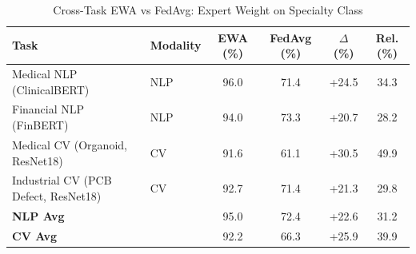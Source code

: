 \begin{table}[t]
\centering
\caption{Cross-Task EWA vs FedAvg: Expert Weight on Specialty Class}
\label{tab:cross-task}
\begin{tabular}{llcccc}
\toprule
Task & Modality & EWA (\%) & FedAvg (\%) & $\Delta$ (\%) & Rel. (\%) \\
\midrule
Medical NLP (ClinicalBERT) & NLP & 96.0 & 71.4 & +24.5 & 34.3 \\
Financial NLP (FinBERT) & NLP & 94.0 & 73.3 & +20.7 & 28.2 \\
Medical CV (Organoid, ResNet18) & CV & 91.6 & 61.1 & +30.5 & 49.9 \\
Industrial CV (PCB Defect, ResNet18) & CV & 92.7 & 71.4 & +21.3 & 29.8 \\
\midrule
\textbf{NLP Avg} & & 95.0 & 72.4 & +22.6 & 31.2 \\
\textbf{CV Avg} & & 92.2 & 66.3 & +25.9 & 39.9 \\
\bottomrule
\end{tabular}
\end{table}
